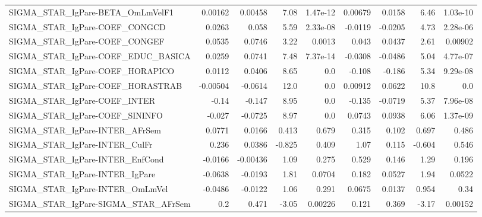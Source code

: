 \begin{tabular}{lrrrrrrrr}
SIGMA\_STAR\_IgPare-BETA\_OmLmVelF1      &     0.00162 &      0.00458 &    7.08 & 1.47e-12 &    0.00679 &      0.0158 &         6.46 &      1.03e-10 \\
SIGMA\_STAR\_IgPare-COEF\_CONGCD         &      0.0263 &        0.058 &    5.59 & 2.33e-08 &    -0.0119 &     -0.0205 &         4.73 &      2.28e-06 \\
SIGMA\_STAR\_IgPare-COEF\_CONGEF         &      0.0535 &       0.0746 &    3.22 &   0.0013 &      0.043 &      0.0437 &         2.61 &       0.00902 \\
SIGMA\_STAR\_IgPare-COEF\_EDUC\_BASICA    &      0.0259 &       0.0741 &    7.48 & 7.37e-14 &    -0.0308 &     -0.0486 &         5.04 &      4.77e-07 \\
SIGMA\_STAR\_IgPare-COEF\_HORAPICO       &      0.0112 &       0.0406 &    8.65 &      0.0 &     -0.108 &      -0.186 &         5.34 &      9.29e-08 \\
SIGMA\_STAR\_IgPare-COEF\_HORASTRAB      &    -0.00504 &      -0.0614 &    12.0 &      0.0 &    0.00912 &      0.0622 &         10.8 &           0.0 \\
SIGMA\_STAR\_IgPare-COEF\_INTER          &       -0.14 &       -0.147 &    8.95 &      0.0 &     -0.135 &     -0.0719 &         5.37 &      7.96e-08 \\
SIGMA\_STAR\_IgPare-COEF\_SININFO        &      -0.027 &      -0.0725 &    8.97 &      0.0 &     0.0743 &      0.0938 &         6.06 &      1.37e-09 \\
SIGMA\_STAR\_IgPare-INTER\_AFrSem        &      0.0771 &       0.0166 &   0.413 &    0.679 &      0.315 &       0.102 &        0.697 &         0.486 \\
SIGMA\_STAR\_IgPare-INTER\_CulFr         &       0.236 &       0.0386 &  -0.825 &    0.409 &       1.07 &       0.115 &       -0.604 &         0.546 \\
SIGMA\_STAR\_IgPare-INTER\_EnfCond       &     -0.0166 &     -0.00436 &    1.09 &    0.275 &      0.529 &       0.146 &         1.29 &         0.196 \\
SIGMA\_STAR\_IgPare-INTER\_IgPare        &     -0.0638 &      -0.0193 &    1.81 &   0.0704 &      0.182 &      0.0527 &         1.94 &        0.0522 \\
SIGMA\_STAR\_IgPare-INTER\_OmLmVel       &     -0.0486 &      -0.0122 &    1.06 &    0.291 &     0.0675 &      0.0137 &        0.954 &          0.34 \\
SIGMA\_STAR\_IgPare-SIGMA\_STAR\_AFrSem   &         0.2 &        0.471 &   -3.05 &  0.00226 &      0.121 &       0.369 &        -3.17 &       0.00152 \\

\end{tabular}
